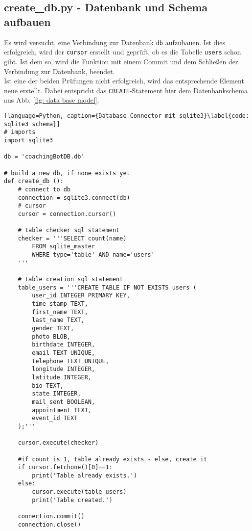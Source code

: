         \subsection{create\_db.py - Datenbank und Schema aufbauen}
            Es wird versucht, eine Verbindung zur Datenbank \verb|db| aufzubauen. Ist dies erfolgreich, wird der \verb|cursor| erstellt und geprüft, ob es die Tabelle \verb|users| schon gibt. Ist dem so, wird die Funktion mit einem Commit und dem Schließen der Verbindung zur Datenbank, beendet. \\
            Ist eine der beiden Prüfungen nicht erfolgreich, wird das entsprechende Element neue erstellt. Dabei entspricht das \verb|CREATE|-Statement hier dem Datenbankschema aus Abb. \ref*{fig: data base model}.
            \begin{lstlisting}[language=Python, caption={Database Connector mit sqlite3}\label{code: sqlite3 schema}]
# imports
import sqlite3

db = 'coachingBotDB.db'

# build a new db, if none exists yet
def create_db ():
    # connect to db
    connection = sqlite3.connect(db)
    # cursor
    cursor = connection.cursor()

    # table checker sql statement
    checker = '''SELECT count(name)
        FROM sqlite_master
        WHERE type='table' AND name='users'
    '''

    # table creation sql statement
    table_users = '''CREATE TABLE IF NOT EXISTS users (
        user_id INTEGER PRIMARY KEY,
        time_stamp TEXT,
        first_name TEXT,
        last_name TEXT,
        gender TEXT,
        photo BLOB,
        birthdate INTEGER,
        email TEXT UNIQUE,
        telephone TEXT UNIQUE,
        longitude INTEGER,
        latitude INTEGER,
        bio TEXT,
        state INTEGER,
        mail_sent BOOLEAN,
        appointment TEXT,
        event_id TEXT
    );'''

    cursor.execute(checker)

    #if count is 1, table already exists - else, create it
    if cursor.fetchone()[0]==1:
        print('Table already exists.')
    else:
        cursor.execute(table_users)
        print('Table created.')

    connection.commit()
    connection.close()
                \end{lstlisting}


